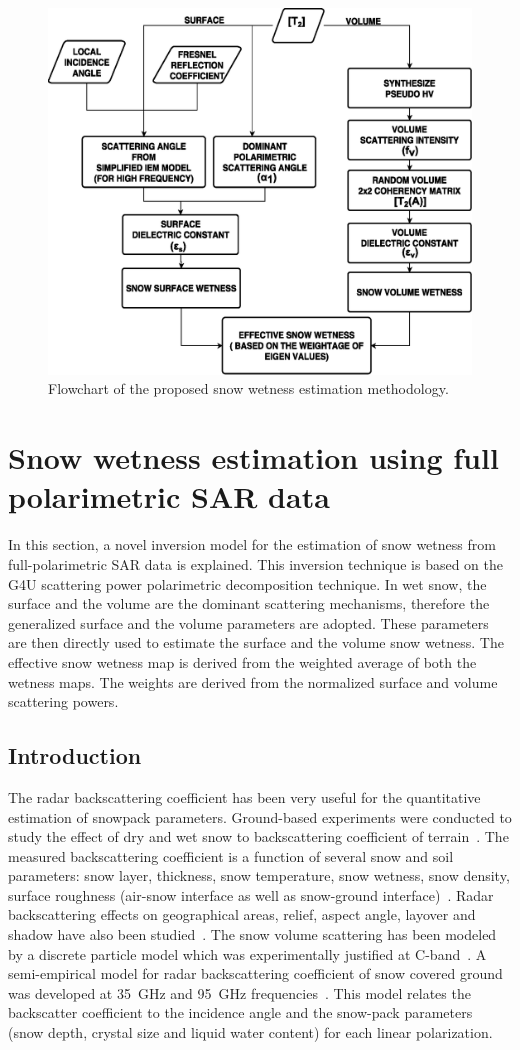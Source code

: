 \begin{figure}
		\centering
		\includegraphics[width=0.6\columnwidth]{Figures_SW2/flow_chart}
		\caption [Flowchart of snow wetness estimation method for dual-pol data]{Flowchart of the proposed snow wetness estimation methodology.}
		\label{fig:flow_chart_sw_dual_pol}
\end{figure}	
\section{Snow wetness estimation using full polarimetric SAR data}
\label{sec:3.2}
In this section, a novel inversion model for the estimation of snow wetness from full-polarimetric SAR data is explained. This inversion technique is based on the G4U scattering power polarimetric decomposition technique. In wet snow, the surface and the volume are the dominant scattering mechanisms, therefore the generalized surface and the volume parameters are adopted. These parameters are then directly used to estimate the surface and the volume snow wetness. The effective snow wetness map is derived from the weighted average of both the wetness maps. The weights are derived from the normalized surface and volume scattering powers. 
\subsection*{Introduction}
The radar backscattering coefficient has been very useful for the quantitative estimation of snowpack parameters. Ground-based experiments were conducted to study the effect of dry and wet snow to backscattering coefficient of terrain~\citep{Stiles1980}. The measured backscattering coefficient is a function of several snow and soil parameters: snow layer, thickness, snow temperature, snow wetness, snow density, surface roughness (air-snow interface as well as snow-ground interface)~\citep{ulaby1986microwave}. Radar backscattering effects on geographical areas, relief, aspect angle, layover and shadow have also been studied~\citep{Koskinen97,Nagler2000,small2011flattening}. The snow volume scattering has been modeled by a discrete particle model which was experimentally justified at C-band~\citep{Kendra98,Koskinen2000}. A semi-empirical model for radar backscattering coefficient of snow covered ground was developed at 35~GHz and 95~GHz frequencies~\citep{Ulaby95}. This model relates the backscatter coefficient to the incidence angle and the snow-pack parameters (snow depth, crystal size and liquid water content) for each linear polarization.  

